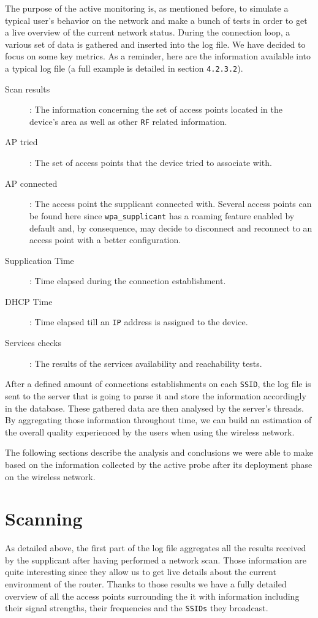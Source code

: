 The purpose of the active monitoring is, as mentioned before, to simulate a typical user's behavior on the network and make a bunch of tests in order to get a live overview of the current network status. During the connection loop, a various set of data is gathered and inserted into the log file. We have decided to focus on some key metrics. As a reminder, here are the information available into a typical log file (a full example is detailed in section \texttt{4.2.3.2}).

\begin{description}
	\item[Scan results]: The information concerning the set of access points located in the device's area as well as other \texttt{RF} related information.
	\item[AP tried]: The set of access points that the device tried to associate with.
	\item[AP connected]: The access point the supplicant connected with. Several access points can be found here since \texttt{wpa\_supplicant} has a roaming feature enabled by default and, by consequence, may decide to disconnect and reconnect to an access point with a better configuration.
	\item[Supplication Time]: Time elapsed during the connection establishment.
	\item [DHCP Time]: Time elapsed till an \texttt{IP} address is assigned to the device.
	\item [Services checks]: The results of the services availability and reachability tests.
\end{description}

After a defined amount of connections establishments on each \texttt{SSID}, the log file is sent to the server that is going to parse it and store the information accordingly in the database. These gathered data are then analysed by the server's threads. By aggregating those information throughout time, we can build an estimation of the overall quality experienced by the users when using the wireless network.

The following sections describe the analysis and conclusions we were able to make based on the information collected by the active probe after its deployment phase on the wireless network.


\section{Scanning}
As detailed above, the first part of the log file aggregates all the results received by the supplicant after having performed a network scan. Those information are quite interesting since they allow us to get live details about the current environment of the router. Thanks to those results we have a fully detailed overview of all the access points surrounding the it with information including their signal strengths, their frequencies and the \texttt{SSIDs} they broadcast.


